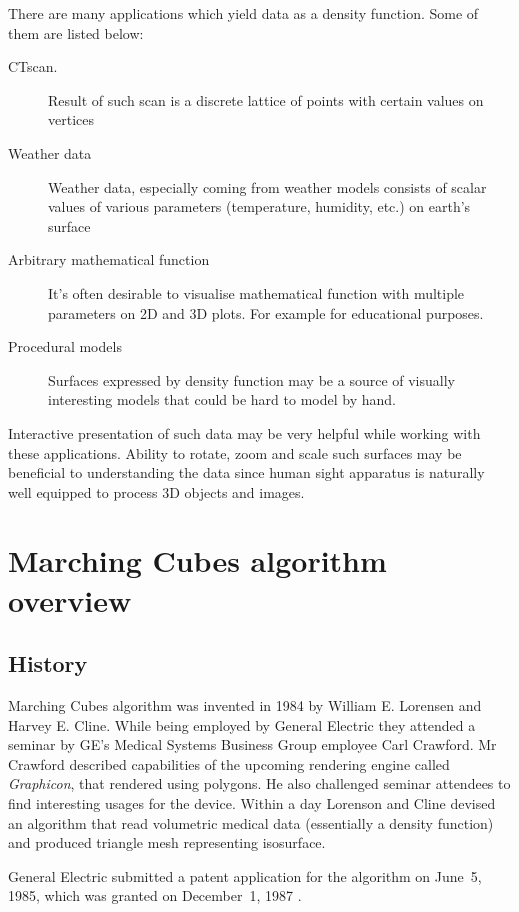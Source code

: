 There are many applications which yield data as a density function. Some of them
are listed below:
\begin{description}
	\item[CT\footnotemark scan.]
		Result of such scan is a discrete lattice of points with certain
		values on vertices
	\item[Weather data]
		Weather data, especially coming from weather models consists of
		scalar values of various parameters (temperature, humidity, etc.)
		on earth's surface
	\item[Arbitrary mathematical function]
		It's often desirable to visualise mathematical function with
		multiple parameters on 2D and 3D plots. For example for
		educational purposes.
	\item[Procedural models]
		Surfaces expressed by density function may be a source of
		visually interesting models that could be hard to model by hand.
\end{description}

Interactive presentation of such data may be very helpful while working with
these applications. Ability to rotate, zoom and scale such surfaces may be
beneficial to understanding the data since human sight apparatus is naturally
well equipped to process 3D objects and images.

\section{Marching Cubes algorithm overview}
\subsection{History \parencite{mchist}}
Marching Cubes algorithm was invented in 1984 by William E. Lorensen and Harvey
E. Cline. While being employed by General Electric they attended a seminar by
GE's Medical Systems Business Group employee Carl Crawford. Mr Crawford
described capabilities of the upcoming rendering engine called \emph{Graphicon},
that rendered using polygons. He also challenged seminar attendees to find
interesting usages for the device. Within a day Lorenson and Cline devised an
algorithm that read volumetric medical data (essentially a density function) and
produced triangle mesh representing isosurface.

General Electric submitted a patent application for the algorithm on
June~5, 1985, which was granted on December~1, 1987 \parencite{mcpatent}.

